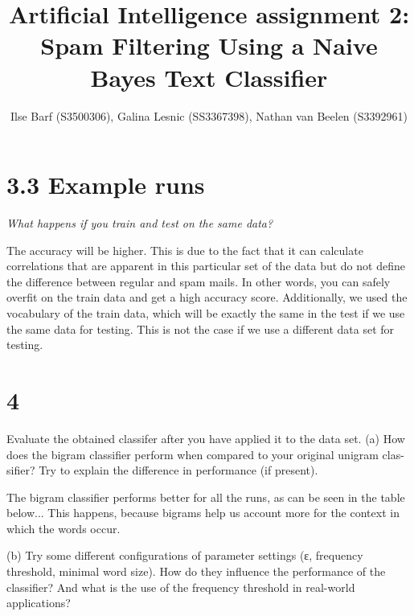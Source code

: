 \documentclass{article}
\title{Artificial Intelligence assignment 2: Spam Filtering Using a Naive Bayes Text Classifier}
\author{Ilse Barf (S3500306), Galina Lesnic (SS3367398), Nathan van Beelen (S3392961)}
\begin{document}
\maketitle

\section*{3.3 Example runs}
\textit{What happens if you train and test on the same data?}

The accuracy will be higher. This is due to the fact that it can calculate
correlations that are apparent in this particular set of the data but do not
define the difference between regular and spam mails. In other words, you can
safely overfit on the train data and get a high accuracy score. Additionally,
we used the vocabulary of the train data, which will be exactly the same in the
test if we use the same data for testing. This is not the case if we use a
different data set for testing.

\section*{4}

Evaluate the obtained classifer after you have applied it to the data set.
(a) How does the bigram classifier perform when compared to your original unigram clas- sifier? Try to explain the difference in performance (if present).

The bigram classifier performs better for all the runs, as can be seen in the table below... This happens, because bigrams help us account more for the context in which the words occur.

(b) Try some different configurations of parameter settings (ε, frequency threshold, minimal word size). How do they influence the performance of the classifier? And what is the use of the frequency threshold in real-world applications?
\end{document}
